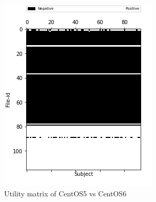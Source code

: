 \documentclass[10pt, conference, compsocconf]{IEEEtran}
\begin{document}
\begin{figure}
  \centering
  \begin{subfigure}[b]{0.5\linewidth}
	\includegraphics[width=\columnwidth]{figures/utility_5vs6_PFS}
  \caption{Utility matrix of CentOS5 vs CentOS6}
  \end{subfigure}
  \begin{subfigure}[b]{0.5\linewidth}

\end{subfigure}
\end{figure}
\end{document}
